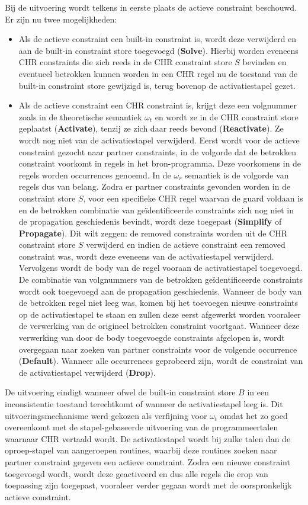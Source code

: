 Bij de uitvoering wordt telkens in eerste plaats de actieve constraint beschouwd. Er zijn nu twee mogelijkheden: \begin{itemize}
\item Als de actieve constraint een built-in constraint is, wordt deze verwijderd en aan de built-in constraint store toegevoegd ({\bf Solve}). Hierbij worden eveneens CHR constraints die zich reeds in de CHR constraint store $S$ bevinden en eventueel betrokken kunnen worden in een CHR regel nu de toestand van de built-in constraint store gewijzigd is, terug bovenop de activatiestapel gezet.
\item Als de actieve constraint een CHR constraint is, krijgt deze een volgnummer zoals in de theoretische semantiek $\omega_t$ en wordt ze in de CHR constraint store geplaatst ({\bf Activate}), tenzij ze zich daar reeds bevond ({\bf Reactivate}). Ze wordt nog niet van de activatiestapel verwijderd. Eerst wordt voor de actieve constraint gezocht naar partner constraints, in de volgorde dat de betrokken constraint voorkomt in regels in het bron-programma. Deze voorkomens in de regels worden occurrences genoemd. In de $\omega_r$ semantiek is de volgorde van regels dus van belang. Zodra er partner constraints gevonden worden in de constraint store $S$, voor een specifieke CHR regel waarvan de guard voldaan is en de betrokken combinatie van ge\"identificeerde constraints zich nog niet in de propagation geschiedenis bevindt, wordt deze toegepast ({\bf Simplify} of {\bf Propagate}). Dit wilt zeggen: de removed constraints worden uit de CHR constraint store $S$ verwijderd en indien de actieve constraint een removed constraint was, wordt deze eveneens van de activatiestapel verwijderd. Vervolgens wordt de body van de regel vooraan de activatiestapel toegevoegd. De combinatie van volgnummers van de betrokken ge\"identificeerde constraints wordt ook toegevoegd aan de propagation geschiedenis. Wanneer de body van de betrokken regel niet leeg was, komen bij het toevoegen nieuwe constraints op de activatiestapel te staan en zullen deze eerst afgewerkt worden vooraleer de verwerking van de origineel betrokken constraint voortgaat. Wanneer deze verwerking van door de body toegevoegde constraints afgelopen is, wordt overgegaan naar zoeken van partner constraints voor de volgende occurrence ({\bf Default}). Wanneer alle occurrences geprobeerd zijn, wordt de constraint van de activatiestapel verwijderd ({\bf Drop}).
\end{itemize}
De uitvoering eindigt wanneer ofwel de built-in constraint store $B$ in een inconsistentie toestand terechtkomt of wanneer de activatiestapel leeg is. Dit uitvoeringsmechanisme werd gekozen als verfijning voor $\omega_t$ omdat het zo goed overeenkomt met de stapel-gebaseerde uitvoering van de programmeertalen waarnaar CHR vertaald wordt. De activatiestapel wordt bij zulke talen dan de oproep-stapel van aangeroepen routines, waarbij deze routines zoeken naar partner constraint gegeven een actieve constraint. Zodra een nieuwe constraint toegevoegd wordt, wordt deze geactiveerd en dus alle regels die erop van toepassing zijn toegepast, vooraleer verder gegaan wordt met de oorspronkelijk actieve constraint.


